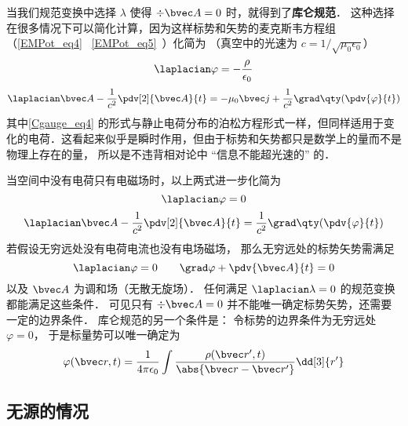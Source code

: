 
\begin{issues}
\issueDraft
\end{issues}


当我们规范变换中选择 $\lambda$ 使得 $\div \bvec A = 0$ 时，就得到了\textbf{库仑规范}． 这种选择在很多情况下可以简化计算，因为这样标势和矢势的麦克斯韦方程组（\autoref{EMPot_eq4}~ \autoref{EMPot_eq5}~）化简为 （真空中的光速为 $c = 1/\sqrt{\mu_0\epsilon_0}$）%
\begin{equation}\label{Cgauge_eq4}
\laplacian \varphi = -\frac{\rho}{\epsilon_0}
\end{equation}
\begin{equation}
\laplacian \bvec A - \frac{1}{c^2} \pdv[2]{\bvec A}{t} = -\mu_0\bvec j + \frac{1}{c^2} \grad\qty(\pdv{\varphi}{t})
\end{equation}
其中\autoref{Cgauge_eq4} 的形式与静止电荷分布的泊松方程形式一样，但同样适用于变化的电荷．这看起来似乎是瞬时作用，但由于标势和矢势都只是数学上的量而不是物理上存在的量， 所以是不违背相对论中 “信息不能超光速的” 的．

当空间中没有电荷只有电磁场时，以上两式进一步化简为
\begin{equation}
\laplacian \varphi = 0
\end{equation}
\begin{equation}
\laplacian \bvec A - \frac{1}{c^2}\pdv[2]{\bvec A}{t} = \frac{1}{c^2} \grad\qty(\pdv{\varphi}{t})
\end{equation}
若假设无穷远处没有电荷电流也没有电场磁场， 那么无穷远处的标势矢势需满足
\begin{equation}
\laplacian \varphi = 0 \qquad
\grad \varphi + \pdv{\bvec A}{t} = 0
\end{equation}
以及 $\bvec A$ 为调和场（无散无旋场）． 任何满足 $\laplacian \lambda = 0$ 的规范变换都能满足这些条件． 可见只有 $\div \bvec A = 0$ 并不能唯一确定标势矢势，还需要一定的边界条件． 库仑规范的另一个条件是： 令标势的边界条件为无穷远处 $\varphi = 0$， 于是标量势可以唯一确定为
\begin{equation}\label{Cgauge_eq1}
\varphi(\bvec r, t) = \frac{1}{4\pi\epsilon_0} \int \frac{\rho(\bvec r', t)}{\abs{\bvec r - \bvec r'}} \dd[3]{r'}
\end{equation}

\subsection{无源的情况}

